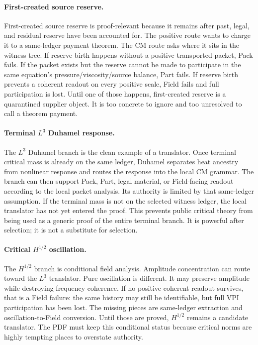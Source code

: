\paragraph{First-created source reserve.}
First-created source reserve is proof-relevant because it remains after past,
legal, and residual reserve have been accounted for.
The positive route wants to charge it to a same-ledger payment theorem.
The CM route asks where it sits in the witness tree.
If reserve birth happens without a positive transported packet, Pack fails.
If the packet exists but the reserve cannot be made to participate in the same
equation's pressure/viscosity/source balance, Part fails.
If reserve birth prevents a coherent readout on every positive scale, Field
fails and full participation is lost.
Until one of those happens, first-created reserve is a quarantined supplier
object.
It is too concrete to ignore and too unresolved to call a theorem payment.

\paragraph{Terminal \(L^3\) Duhamel response.}
The \(L^3\) Duhamel branch is the clean example of a translator.
Once terminal critical mass is already on the same ledger, Duhamel separates
heat ancestry from nonlinear response and routes the response into the local
CM grammar.
The branch can then support Pack, Part, legal material, or Field-facing
readout according to the local packet analysis.
Its authority is limited by that same-ledger assumption.
If the terminal mass is not on the selected witness ledger, the local
translator has not yet entered the proof.
This prevents public critical theory from being used as a generic proof of
the entire terminal branch.
It is powerful after selection; it is not a substitute for selection.

\paragraph{Critical \(H^{1/2}\) oscillation.}
The \(H^{1/2}\) branch is conditional field analysis.
Amplitude concentration can route toward the \(L^3\) translator.
Pure oscillation is different.
It may preserve amplitude while destroying frequency coherence.
If no positive coherent readout survives, that is a Field failure: the same
history may still be identifiable, but full VPI participation has been lost.
The missing pieces are same-ledger extraction and oscillation-to-Field
conversion.
Until those are proved, \(H^{1/2}\) remains a candidate translator.
The PDF must keep this conditional status because critical norms are highly
tempting places to overstate authority.

